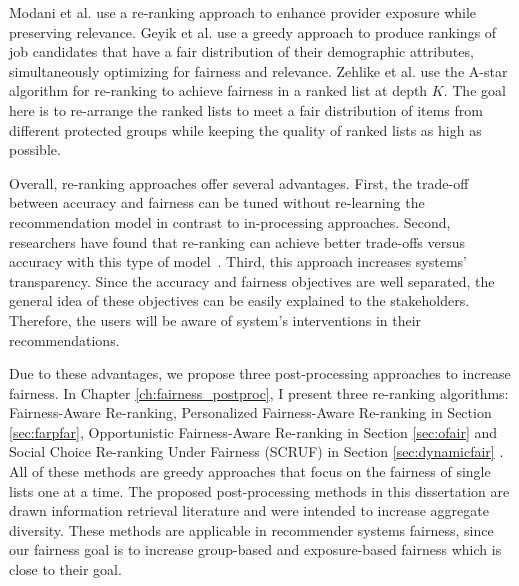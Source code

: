         Modani et al. \cite{modani2017fairness} use a re-ranking approach to enhance provider exposure while preserving relevance. Geyik et al. \cite{Geyik2019} use a greedy approach to produce rankings of job candidates that have a fair distribution of their demographic attributes, simultaneously optimizing for fairness and relevance. Zehlike et al. \cite{zehlike2017fa} use the A-star algorithm for re-ranking to achieve fairness in a ranked list at depth $K$. The goal here is to re-arrange the ranked lists to meet a fair distribution of items from different protected groups while keeping the quality of ranked lists as high as possible. 

        Overall, re-ranking approaches offer several advantages. First, the trade-off between accuracy and fairness can be tuned without re-learning the recommendation model in contrast to in-processing approaches. Second, researchers have found that re-ranking can achieve better trade-offs versus accuracy with this type of model~\cite{abdollahpouri2019managing,liu2019personalized}. Third, this approach increases systems' transparency. Since the accuracy and fairness objectives are well separated, the general idea of these objectives can be easily explained to the stakeholders. Therefore, the users will be aware of system's interventions in their recommendations.
        
        Due to these advantages, we propose three post-processing approaches to increase fairness. In  Chapter \ref{ch:fairness_postproc}, I present three re-ranking algorithms: Fairness-Aware Re-ranking, Personalized Fairness-Aware Re-ranking in Section \ref{sec:farpfar}, Opportunistic Fairness-Aware Re-ranking in Section \ref{sec:ofair} and Social Choice Re-ranking Under Fairness (SCRUF) in Section \ref{sec:dynamicfair} . All of these methods are greedy approaches that focus on the fairness of single lists one at a time. The proposed post-processing methods in this dissertation are drawn information retrieval literature and were intended to increase aggregate diversity. These methods are applicable in recommender systems fairness, since our fairness goal is to increase group-based and exposure-based fairness which is close to their goal.